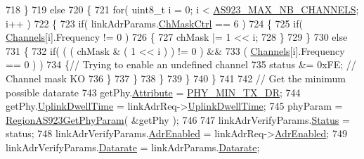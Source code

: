 \begin{DoxyCode}
718         \}
719         \textcolor{keywordflow}{else}
720         \{
721             \textcolor{keywordflow}{for}( uint8\_t i = 0; i < \mbox{\hyperlink{group___r_e_g_i_o_n_a_s923_ga02e3db7e4557dbf77db79285d38dc33e}{AS923\_MAX\_NB\_CHANNELS}}; i++ )
722             \{
723                 \textcolor{keywordflow}{if}( linkAdrParams.\mbox{\hyperlink{structs_region_common_link_adr_params_ac5e1891f30a172b2ce39bc3498e1843d}{ChMaskCtrl}} == 6 )
724                 \{
725                     \textcolor{keywordflow}{if}( \mbox{\hyperlink{_region_a_s923_8c_a02bae2504563543865d6b0e81c48ab61}{Channels}}[i].Frequency != 0 )
726                     \{
727                         chMask |= 1 << i;
728                     \}
729                 \}
730                 \textcolor{keywordflow}{else}
731                 \{
732                     \textcolor{keywordflow}{if}( ( ( chMask & ( 1 << i ) ) != 0 ) &&
733                         ( \mbox{\hyperlink{_region_a_s923_8c_a02bae2504563543865d6b0e81c48ab61}{Channels}}[i].Frequency == 0 ) )
734                     \{\textcolor{comment}{// Trying to enable an undefined channel}
735                         status &= 0xFE; \textcolor{comment}{// Channel mask KO}
736                     \}
737                 \}
738             \}
739         \}
740     \}
741 
742     \textcolor{comment}{// Get the minimum possible datarate}
743     getPhy.\mbox{\hyperlink{structs_get_phy_params_abdcb168ffd6913b85e2f635d7a475f2d}{Attribute}} = \mbox{\hyperlink{group___r_e_g_i_o_n_gga51cbe8f5433d914fe9cf81b451de2c2daace3e56c88b40def8ed6a9106871e7de}{PHY\_MIN\_TX\_DR}};
744     getPhy.\mbox{\hyperlink{structs_get_phy_params_a0e6663762d6f9173bc8d8cb018f8f17a}{UplinkDwellTime}} = linkAdrReq->\mbox{\hyperlink{structs_link_adr_req_params_a0e6663762d6f9173bc8d8cb018f8f17a}{UplinkDwellTime}};
745     phyParam = \mbox{\hyperlink{group___r_e_g_i_o_n_a_s923_ga20508dee35c0f25ff507478c5235fdeb}{RegionAS923GetPhyParam}}( &getPhy );
746 
747     linkAdrVerifyParams.\mbox{\hyperlink{structs_region_common_link_adr_req_verify_params_a7ca418fa247ab5f1df4e8b5852d8b738}{Status}} = status;
748     linkAdrVerifyParams.\mbox{\hyperlink{structs_region_common_link_adr_req_verify_params_ab3e2fb44577c95786e11aacd56769703}{AdrEnabled}} = linkAdrReq->\mbox{\hyperlink{structs_link_adr_req_params_ab3e2fb44577c95786e11aacd56769703}{AdrEnabled}};
749     linkAdrVerifyParams.\mbox{\hyperlink{structs_region_common_link_adr_req_verify_params_ae2f6080f3aa0e9485c55513ca56bb24d}{Datarate}} = linkAdrParams.\mbox{\hyperlink{structs_region_common_link_adr_params_ae2f6080f3aa0e9485c55513ca56bb24d}{Datarate}};

\end{DoxyCode}
